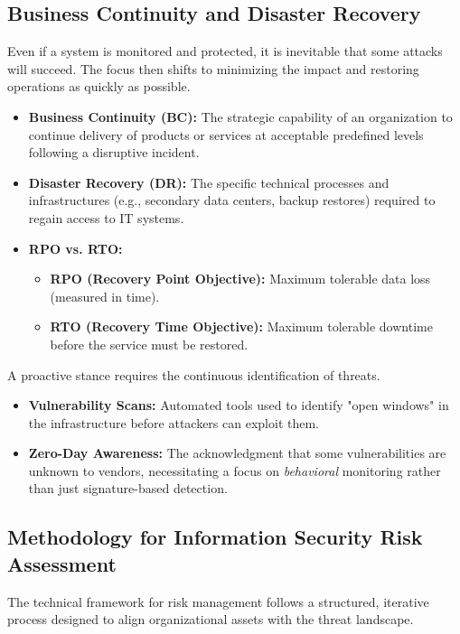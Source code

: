 \subsection{Business Continuity and Disaster Recovery}
Even if a system is monitored and protected, it is inevitable that some attacks will succeed. The focus then shifts to minimizing the impact and restoring operations as quickly as possible.
\begin{itemize}
    \item \textbf{Business Continuity (BC):} The strategic capability of an organization to continue delivery of products or services at acceptable predefined levels following a disruptive incident.
    \item \textbf{Disaster Recovery (DR):} The specific technical processes and infrastructures (e.g., secondary data centers, backup restores) required to regain access to IT systems.
    \item \textbf{RPO vs. RTO:} 
    \begin{itemize}
        \item \textbf{RPO (Recovery Point Objective):} Maximum tolerable data loss (measured in time).
        \item \textbf{RTO (Recovery Time Objective):} Maximum tolerable downtime before the service must be restored.
    \end{itemize}
\end{itemize}


\noindent
A proactive stance requires the continuous identification of threats.
\begin{itemize}
    \item \textbf{Vulnerability Scans:} Automated tools used to identify "open windows" in the infrastructure before attackers can exploit them.
    \item \textbf{Zero-Day Awareness:} The acknowledgment that some vulnerabilities are unknown to vendors, necessitating a focus on \textit{behavioral} monitoring rather than just signature-based detection.
\end{itemize}



\subsection{Methodology for Information Security Risk Assessment}
The technical framework for risk management follows a structured, iterative process designed to align organizational assets with the threat landscape. 

